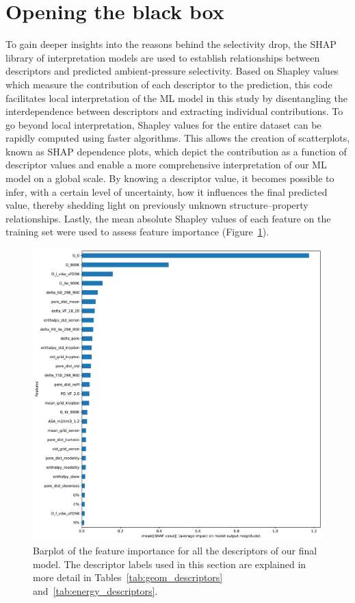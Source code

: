 \documentclass[main]{subfiles}
\begin{document}
\section{Opening the black box}

To gain deeper insights into the reasons behind the selectivity drop, the SHAP library of interpretation models\autocite{SHAP,molnar2020interpretable} are used to establish relationships between descriptors and predicted ambient-pressure selectivity. Based on Shapley values\autocite{shapley1953value} which measure the contribution of each descriptor to the prediction, this code facilitates local interpretation of the ML model in this study by disentangling the interdependence between descriptors and extracting individual contributions. To go beyond local interpretation, Shapley values for the entire dataset can be rapidly computed using faster algorithms.\autocite{SHAP} This allows the creation of scatterplots, known as SHAP dependence plots, which depict the contribution as a function of descriptor values and enable a more comprehensive interpretation of our ML model on a global scale. By knowing a descriptor value, it becomes possible to infer, with a certain level of uncertainty, how it influences the final predicted value, thereby shedding light on previously unknown structure--property relationships. Lastly, the mean absolute Shapley values of each feature on the training set were used to assess feature importance (Figure~\ref{fgr:featimp_shap}).

\begin{figure}[ht]
  \centering
    \includegraphics[width=0.70\linewidth]{figures/4-ml/SI_figure/Feature_importance_shapbased.pdf}
    \caption{Barplot of the feature importance for all the descriptors of our final model. The descriptor labels used in this section are explained in more detail in Tables~\ref{tab:geom_descriptors} and~\ref{tab:energy_descriptors}.}\label{fgr:featimp_shap}
  \end{figure}
\end{document}
